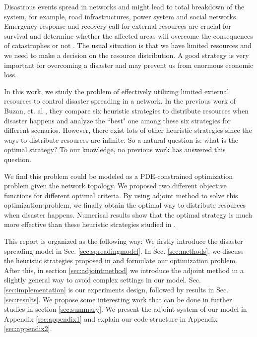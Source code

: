 

Disastrous events spread in networks and might lead to total breakdown of the system,  for example, road infrastructures, power system and social networks. Emergency response and recovery call for external resources are crucial for survival and determine whether the affected areas will overcome the consequences of catastrophes or not \cite{buzna2007efficient}. The usual situation is that we have limited resources and we need to make a decision on the resource distribution. A good strategy is very important for overcoming a disaster and may prevent us from enormous economic loss. 

In this work, we study the problem of effectively utilizing limited external resources to control disaster spreading in a network. In the previous work of Buzan, et. al \cite{buzna2007efficient}, they compare six heuristic strategies to distribute resources when disaster happens and analyze the ``best" one among these six strategies for different scenarios. However, there exist lots of other heuristic strategies since the ways to distribute resources are infinite. So a natural question is: what is the optimal strategy? To our knowledge, no previous work has answered this question.

We find this problem could be modeled as a PDE-constrained optimization problem given the network topology. We proposed two different objective functions for different optimal criteria. By using adjoint method to solve this optimization problem, we finally obtain the optimal way to distribute resources when disaster happens. Numerical results show that the optimal strategy is much more effective than these heuristic strategies studied in \cite{buzna2007efficient}.

This report is organized as the following way: We firstly introduce the disaster spreading model in Sec. \ref{sec:spreadingmodel}. In Sec. \ref{sec:methods}, we discuss the heuristic strategies proposed in \cite{buzna2007efficient} and formulate our optimization problem. After this, in section \ref{sec:adjointmethod} we introduce the adjoint method in a slightly general way to avoid complex settings in our model. Sec. \ref{sec:implementation} is our experiments design, followed by results in Sec. \ref{sec:results}. We propose some interesting work that can be done in further studies in section \ref{sec:summary}. We present the adjoint system of our model in Appendix \ref{sec:appendix1} and explain our code structure in Appendix \ref{sec:appendix2}.

